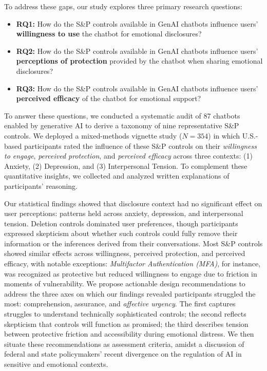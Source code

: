 \documentclass[letterpaper,twocolumn,10pt]{article}
\begin{document}
To address these gaps, our study explores three primary research questions:

\begin{itemize}
    \item \textbf{RQ1:} How do the S\&P controls available in GenAI chatbots influence users' \textbf{willingness to use} the chatbot for emotional disclosures?
    \item \textbf{RQ2:} How do the S\&P controls available in GenAI chatbots influence users' \textbf{perceptions of protection} provided by the chatbot when sharing emotional disclosures?
    \item \textbf{RQ3:} How do the S\&P controls available in GenAI chatbots influence users' \textbf{perceived efficacy} of the chatbot for emotional support?
\end{itemize}

To answer these questions, we conducted a systematic audit of 87 chatbots enabled by generative AI to derive a taxonomy of nine representative S\&P controls. We deployed a mixed-methods vignette study ($N=354$) in which U.S.-based participants rated the influence of these S\&P controls on their \emph{willingness to engage}, \emph{perceived protection}, and \emph{perceived efficacy} across three contexts: (1) Anxiety, (2) Depression, and (3) Interpersonal Tension. To complement these quantitative insights, we collected and analyzed written explanations of participants' reasoning.

Our statistical findings showed that disclosure context had no significant effect on user perceptions: patterns held across anxiety, depression, and interpersonal tension. Deletion controls dominated user preferences, though participants expressed skepticism about whether such controls could fully remove their information or the inferences derived from their conversations. Most S\&P controls showed similar effects across willingness, perceived protection, and perceived efficacy, with notable exceptions: \emph{Multifactor Authentication (MFA)}, for instance, was recognized as protective but reduced willingness to engage due to friction in moments of vulnerability. We propose actionable design recommendations to address the three axes on which our findings revealed participants struggled the most: comprehension, assurance, and \textit{affective urgency}. The first captures struggles to understand technically sophisticated controls; the second reflects skepticism that controls will function as promised; the third describes tension between protective friction and accessibility during emotional distress. We then situate these recommendations as assessment criteria, amidst a discussion of federal and state policymakers' recent divergence on the regulation of AI in sensitive and emotional contexts.
\end{document}
